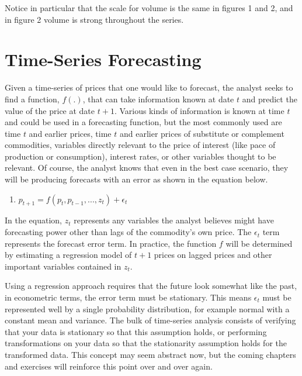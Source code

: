 \documentclass[
  letterpaper,
  DIV=11,
  numbers=noendperiod]{scrreprt}
\providecommand{\tightlist}{%
  \setlength{\itemsep}{0pt}\setlength{\parskip}{0pt}}\usepackage{longtable,booktabs,array}
\begin{document}
Notice in particular that the scale for volume is the same in figures 1
and 2, and in figure 2 volume is strong throughout the series.

\hypertarget{time-series-forecasting}{%
\section{Time-Series Forecasting}\label{time-series-forecasting}}

Given a time-series of prices that one would like to forecast, the
analyst seeks to find a function, \(f(.)\), that can take information
known at date \(t\) and predict the value of the price at date \(t+1\).
Various kinds of information is known at time \(t\) and could be used in
a forecasting function, but the most commonly used are time \(t\) and
earlier prices, time \(t\) and earlier prices of substitute or
complement commodities, variables directly relevant to the price of
interest (like pace of production or consumption), interest rates, or
other variables thought to be relevant. Of course, the analyst knows
that even in the best case scenario, they will be producing forecasts
with an error as shown in the equation below.

\begin{enumerate}
\def\labelenumi{(\arabic{enumi})}
\tightlist
\item
  \(p_{t+1} = f(p_t, p_{t-1}, ..., z_t) + \epsilon_t\)
\end{enumerate}

In the equation, \(z_t\) represents any variables the analyst believes
might have forecasting power other than lags of the commodity's own
price. The \(\epsilon_t\) term represents the forecast error term. In
practice, the function \(f\) will be determined by estimating a
regression model of \(t+1\) prices on lagged prices and other important
variables contained in \(z_t\).

Using a regression approach requires that the future look somewhat like
the past, in econometric terms, the error term must be stationary. This
means \(\epsilon_t\) must be represented well by a single probability
distribution, for example normal with a constant mean and variance. The
bulk of time-series analysis consists of verifying that your data is
stationary so that this assumption holds, or performing transformations
on your data so that the stationarity assumption holds for the
transformed data. This concept may seem abstract now, but the coming
chapters and exercises will reinforce this point over and over again.
\end{document}
